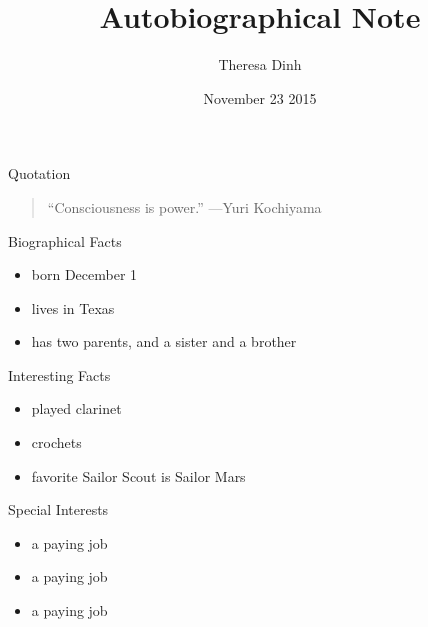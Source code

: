 \documentclass{beamer}
\title{Autobiographical Note}
\author{Theresa Dinh}
\institute{Cornell College}
\date{November 23 2015}
\begin{document}
\begin{frame}
  \titlepage
\end{frame}

\begin{frame}{Quotation}
\begin{quotation}
\noindent
``Consciousness is power.''
  \flushright
  ---Yuri Kochiyama
  \end{quotation}
\end{frame}

\begin{frame}{Biographical Facts}
\begin{itemize}
  \item born December 1 
  \item lives in Texas
  \item has two parents, and a sister and a brother
  \end{itemize}
\end{frame}

\begin{frame}{Interesting Facts}
\begin{itemize}
  \item played clarinet
  \item crochets
  \item favorite Sailor Scout is Sailor Mars
  \end{itemize}
\end{frame}

\begin{frame}{Special Interests}
\begin{itemize}
  \item a paying job
  \item a paying job
  \item a paying job
  \end{itemize}
\end{frame}
\end{document}
